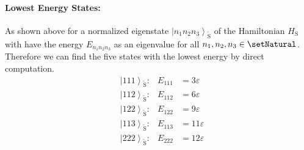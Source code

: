 \documentclass[10pt,fleqn]{article}
\newcommand{\ket}[1]{\left\vert #1 \right\rangle}
\begin{document}
\begin{multicols}{2}
      \paragraph{Lowest Energy States:}
      As shown above for a normalized eigenstate $\ket{n_1n_2n_3}_{\tilde{\mathrm{S}}}$ of the Hamiltonian $H_\mathrm{S}$ with have the energy $E_{n_1n_2n_3}$ as an eigenvalue for all $n_1,n_2,n_3\in\setNatural$.
      Therefore we can find the five states with the lowest energy by direct computation.
      \begin{align*}
        &\ket{111}_{\tilde{\mathrm{S}}}: & E_{111} &= 3ε \\
        &\ket{112}_{\tilde{\mathrm{S}}}: & E_{112} &= 6ε \\
        &\ket{122}_{\tilde{\mathrm{S}}}: & E_{122} &= 9ε \\
        &\ket{113}_{\tilde{\mathrm{S}}}: & E_{113} &= 11ε \\
        &\ket{222}_{\tilde{\mathrm{S}}}: & E_{222} &= 12ε
      \end{align*}
    \end{multicols}
\end{document}
